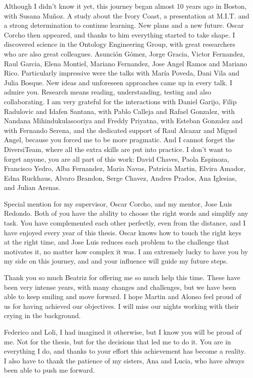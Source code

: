 

\begin{acknowledgements}      %

Although I didn't know it yet, this journey began almost 10 years ago in Boston, with Susana Muñoz. A study about the Ivory Coast, a presentation at M.I.T. and a strong determination to continue learning. New plans and a new future. Oscar Corcho then appeared, and thanks to him everything started to take shape. I discovered science in the Ontology Engineering Group, with great researchers who are also great colleagues. Asunción Gómez, Jorge Gracia, Victor Fernandez, Raul Garcia, Elena Montiel, Mariano Fernandez, Jose Angel Ramos and Mariano Rico. Particularly impressive were the talks with María Poveda, Dani Vila and Julia Bosque. New ideas and unforeseen approaches came up in every talk. I admire you. Research means reading, understanding, testing and also collaborating. I am very grateful for the interactions with Daniel Garijo, Filip Radulovic and Idafen Santana, with Pablo Calleja and Rafael Gonzalez, with Nandana Mihindukulasooriya and Freddy Priyatna, with Esteban Gonzalez and with Fernando Serena, and the dedicated support of Raul Alcazar and Miguel Angel, because you forced me to be more pragmatic. And I cannot forget the DiversiTeam, where all the extra skills are put into practice. I don't want to forget anyone, you are all part of this work: David Chaves, Paola Espinoza, Francisco Yedro, Alba Fernandez, Maria Navas, Patricia Martin, Elvira Amador, Edna Ruckhaus, Alvaro Brandon, Serge Chavez, Andres Prados, Ana Iglesias, and Julian Arenas.

Special mention for my supervisor, Oscar Corcho, and my mentor, Jose Luis Redondo. Both of you have the ability to choose the right words and simplify any task. You have complemented each other perfectly, even from the distance, and I have enjoyed every year of this thesis. Oscar knows how to touch the right keys at the right time, and Jose Luis reduces each problem to the challenge that motivates it, no matter how complex it was. I am extremely lucky to have you by my side on this journey, and and your influence will guide my future steps.

Thank you so much Beatriz for offering me so much help this time. These have been very intense years, with many changes and challenges, but we have been able to keep smiling and move forward. I hope Martin and Alonso feel proud of us for having achieved our objectives. I will miss our nights working with their crying in the background.

Federico and Loli, I had imagined it otherwise, but I know you will be proud of me. Not for the thesis, but for the decisions that led me to do it. You are in everything I do, and thanks to your effort this achievement has become a reality. I also have to thank the patience of my sisters, Ana and Lucia, who have always been able to push me forward.



\end{acknowledgements}



